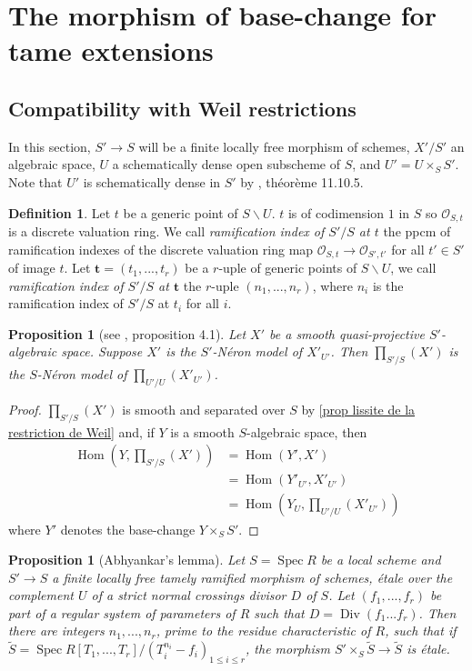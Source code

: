 \documentclass{article}
\renewcommand{\O}{\mathcal{O}}
\DeclareMathOperator{\spec}{Spec}
\DeclareMathOperator{\divi}{Div}
\DeclareMathOperator{\Hom}{Hom}
\newtheorem{prop}[thm]{Proposition}
\theoremstyle{definition}
\newtheorem{defi}[thm]{Definition}
\theoremstyle{remark}
\begin{document}
\section{The morphism of base-change for tame extensions}

\subsection{Compatibility with Weil restrictions}

In this section, $S'\longrightarrow S$ will be a finite locally free morphism of schemes, $X'/S'$ an algebraic space, $U$ a schematically dense open subscheme of $S$, and $U'=U\times_S S'$. Note that $U'$ is schematically dense in $S'$ by \cite{EGA4.3}, théorème 11.10.5.

\begin{defi}
Let $t$ be a generic point of $S\backslash U$. $t$ is of codimension $1$ in $S$ so $\O_{S,t}$ is a discrete valuation ring. We call \emph{ramification index of $S'/S$ at $t$} the ppcm of ramification indexes of the discrete valuation ring map $\O_{S,t}\longrightarrow \O_{S',t'}$ for all $t'\in S'$ of image $t$. Let $\mathbf{t}=(t_1,...,t_r)$ be a $r$-uple of generic points of $S\backslash U$, we call \emph{ramification index of $S'/S$ at $\mathbf{t}$} the $r$-uple $(n_1,...,n_r)$, where $n_i$ is the ramification index of $S'/S$ at $t_i$ for all $i$.
\end{defi}

\begin{prop}[see \cite{TameRamification}, proposition 4.1]
Let $X'$ be a smooth quasi-projective $S'$-algebraic space. Suppose $X'$ is the $S'$-N\'eron model of $X'_{U'}$. Then $\prod\limits_{S'/S}(X')$ is the $S$-N\'eron model of $\prod\limits_{U'/U}(X'_{U'})$.
\end{prop}

\begin{proof}
$\prod\limits_{S'/S}(X')$ is smooth and separated over $S$ by \ref{prop lissite de la restriction de Weil} and, if $Y$ is a smooth $S$-algebraic space, then
\begin{align*}
\Hom(Y,\prod\limits_{S'/S}(X'))&=\Hom(Y',X')\\
&=\Hom(Y'_{U'},X'_{U'})\\
&=\Hom({Y_U,\prod\limits_{U'/U}(X'_{U'})})
\end{align*}
where $Y'$ denotes the base-change $Y\times_S S'$.
\end{proof}

\begin{prop}[Abhyankar's lemma]\label{proposition lemme d'abhyankhar}
Let $S=\spec R$ be a local scheme and $S'\longrightarrow S$ a finite locally free tamely ramified morphism of schemes, \'etale over the complement $U$ of a strict normal crossings divisor $D$ of $S$. Let $(f_1,...,f_r)$ be part of a regular system of parameters of $R$ such that $D=\divi(f_1...f_r)$. Then there are integers $n_1,...,n_r$, prime to the residue characteristic of $R$, such that if $\tilde{S}=\spec R[T_1,...,T_r]/(T_i^{n_i}-f_i)_{1\leq i\leq r}$, the morphism $S'\times_S\tilde{S}\longrightarrow\tilde{S}$ is \'etale.
\end{prop}
\end{document}
